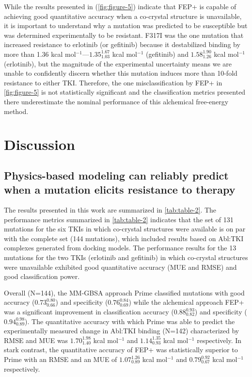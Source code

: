 \documentclass[phd,tocprelim]{cornell}
\renewcommand{\FIG}[1]{\autoref{fig:#1}}
\renewcommand{\TABLE}[1]{\autoref{tab:#1}}
\begin{document}
 While the results presented in (\FIG{figure-5}) indicate that FEP+ is capable of achieving good quantitative accuracy when a co-crystal structure is unavailable, it is important to understand why a mutation was predicted to be susceptible but was determined experimentally to be resistant.
F317I was the one mutation that increased resistance to erlotinib (or gefitinib) because it destabilized binding by more than 1.36 kcal mol$^{-1}$---$1.35^{1.67}_{1.03}$ kcal mol$^{-1}$ (gefitinib) and $1.58^{1.90}_{1.26}$ kcal mol$^{-1}$ (erlotinib), but the magnitude of the experimental uncertainty means we are unable to confidently discern whether this mutation induces more than 10-fold resistance to either TKI.
Therefore, the one misclassification by FEP+ in \FIG{figure-5} is not statistically significant and the classification metrics presented there underestimate the nominal performance of this alchemical free-energy method.

\section{Discussion}

\subsection{Physics-based modeling can reliably predict when a mutation elicits resistance to therapy}
The results presented in this work are summarized in \TABLE{table-2}.
The performance metrics summarized in \TABLE{table-2} indicates that the set of 131 mutations for the six TKIs in which co-crystal structures were available is on par with the complete set (144 mutations), which included results based on Abl:TKI complexes generated from docking models.
The performance results for the 13 mutations for the two TKIs (erlotinib and gefitinib) in which co-crystal structures were unavailable exhibited good quantitative accuracy (MUE and RMSE) and good classification power.    

Overall (N=144), the MM-GBSA approach Prime classified mutations with good accuracy ($0.73^{0.80}_{0.66}$) and specificity ($0.76^{0.84}_{0.69}$)
while the alchemical approach FEP+ was a significant improvement in classification accuracy ($0.88^{0.93}_{0.82}$) and specificity ($0.94^{0.98}_{0.89}$).
The quantitative accuracy with which Prime was able to predict the experimentally measured change in Abl:TKI binding (N=142) characterized by RMSE and MUE was $1.70^{1.98}_{1.40}$ kcal mol$^{-1}$ and $1.14^{1.35}_{0.93}$ kcal mol$^{-1}$ respectively.
In stark contrast, the quantitative accuracy of FEP+ was statistically superior to Prime with an RMSE and an MUE of $1.07^{1.26}_{0.89}$ kcal mol$^{-1}$ and $0.79^{0.92}_{0.67}$ kcal mol$^{-1}$ respectively.
\end{document}
